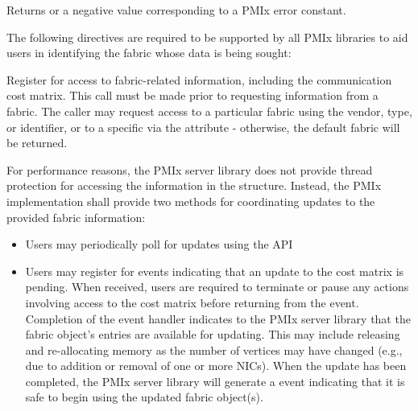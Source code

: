 \begin{arglist}
\end{arglist}

Returns  or a negative value corresponding to a \ac{PMIx} error constant.

\reqattrstart
The following directives are required to be supported by all \ac{PMIx} libraries to aid users in identifying the fabric whose data is being sought:


\reqattrend

\descr

Register for access to fabric-related information, including the communication cost matrix. This call must be made prior to requesting information from a fabric. The caller may request access to a particular fabric using the vendor, type, or identifier, or to a specific  via the  attribute - otherwise, the default fabric will be returned.

For performance reasons, the \ac{PMIx} server library does not provide thread protection for accessing the information in the  structure. Instead, the \ac{PMIx} implementation shall provide two methods for coordinating updates to the provided fabric information:

\begin{itemize}

    \item Users may periodically poll for updates using the  \ac{API}

    \item Users may register for  events indicating that an update to the cost matrix is pending. When received, users are required to terminate or pause any actions involving access to the cost matrix before returning from the event. Completion of the  event handler indicates to the \ac{PMIx} server library that the fabric object's entries are available for updating. This may include releasing and re-allocating memory as the number of vertices may have changed (e.g., due to addition or removal of one or more \acp{NIC}). When the update has been completed, the \ac{PMIx} server library will generate a  event indicating that it is safe to begin using the updated fabric object(s).

\end{itemize}


